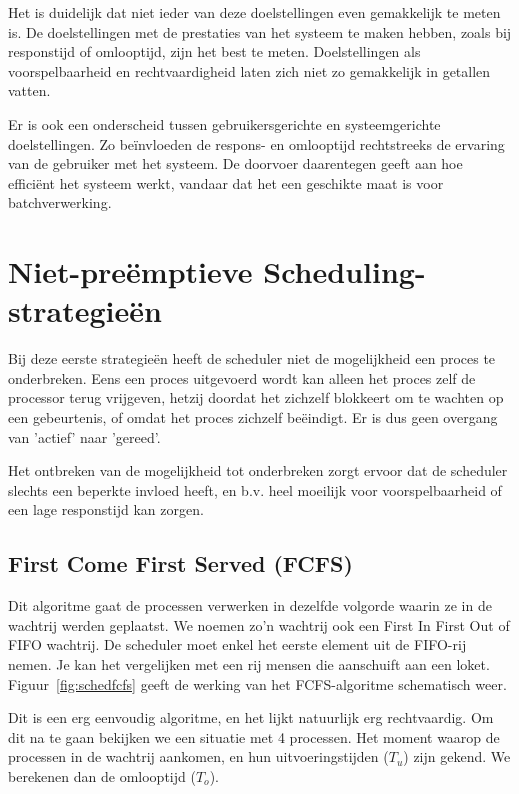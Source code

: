 Het is duidelijk dat niet ieder van deze doelstellingen even
gemakkelijk te meten is. De doelstellingen met de prestaties van het
systeem te maken hebben, zoals bij responstijd of omlooptijd, zijn het
best te meten. Doelstellingen als voorspelbaarheid en rechtvaardigheid
laten zich niet zo gemakkelijk in getallen vatten.

Er is ook een onderscheid tussen gebruikersgerichte en
systeemgerichte doelstellingen. Zo be\"invloeden de respons- en omlooptijd
rechtstreeks de ervaring van de gebruiker met het systeem. De doorvoer
daarentegen geeft aan hoe effici\"ent het systeem werkt, vandaar dat het
een geschikte maat is voor batchverwerking.

\section{Niet-pre\"emptieve Scheduling-strategie\"en}

Bij deze eerste strategie\"en heeft de scheduler niet de
mogelijkheid een proces te onderbreken. Eens een proces uitgevoerd wordt
kan alleen het proces zelf de processor terug vrijgeven, hetzij doordat
het zichzelf blokkeert om te wachten op een gebeurtenis, of omdat het
proces zichzelf be\"eindigt. Er is dus geen overgang van 'actief' naar
'gereed'.

Het ontbreken van de mogelijkheid tot onderbreken zorgt ervoor dat
de scheduler slechts een beperkte invloed heeft, en b.v. heel moeilijk
voor voorspelbaarheid of een lage responstijd kan zorgen.

\subsection{First Come First Served (FCFS)}

Dit algoritme gaat de processen verwerken in dezelfde volgorde
waarin ze in de wachtrij werden geplaatst. We noemen zo'n wachtrij ook
een First In First Out of FIFO wachtrij. De scheduler moet enkel het
eerste element uit de FIFO-rij nemen. Je kan het vergelijken met een
rij mensen die aanschuift aan een loket. Figuur~\ref{fig:schedfcfs} geeft de werking van het FCFS-algoritme schematisch weer.

Dit is een erg eenvoudig algoritme, en het lijkt natuurlijk erg
rechtvaardig. Om dit na te gaan bekijken we een situatie met 4 processen. Het
moment waarop de processen in de wachtrij aankomen, en hun uitvoeringstijden
($T_u$) zijn gekend. We berekenen dan de omlooptijd ($T_o$).

